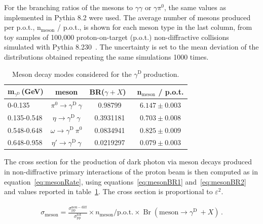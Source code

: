 \documentclass[12pt,a4paper]{article}
\newcommand{\mathDP}{\gamma^{\mathrm{D}}\ }
\newcommand{\DP}{$\mathDP$}
\newcommand{\mDP}{m$_{\mathDP}$}
\newcommand{\Br}{\mathop\mathrm{Br}}
\begin{document}
For the branching ratios of the mesons to $\gamma\gamma$ or
$\gamma\pi^0$, the same values as implemented in Pythia 8.2 were
used. The average number of mesons produced per p.o.t.,
n$_{\mathrm{meson}}$ / p.o.t., is shown for each meson type in the
last column, from toy samples of 100,000 proton-on-target (p.o.t.)
non-diffractive collisions simulated with Pythia
8.230~\cite{Sjostrand:2014zea}. The uncertainty is set to the mean
deviation of the distributions obtained repeating the same simulations
1000 times.


\begin{table}[thbp]
  \centering
  \begin{tabular}{|l|c|c|c|}
\hline
\mDP (GeV) & meson &  BR($\gamma+X$)~\cite{Sjostrand:2014zea} & n$_{\mathrm{meson}}$ / p.o.t. \\
\hline 
0-0.135  &    $\pi^{0}\rightarrow\mathDP\gamma$ &  0.98799 &  $6.147 \pm 0.003$ \\
0.135-0.548  &   $\eta\rightarrow\mathDP\gamma$ &  0.3931181 &  $0.703 \pm 0.008$\\
0.548-0.648  &   $\omega\rightarrow\mathDP\pi^0$ & 0.0834941 &  $0.825 \pm 0.009$ \\
0.648-0.958  &    $\eta'\rightarrow\mathDP\gamma$ & 0.0219297 & $0.079 \pm 0.003$ \\
\hline
\end{tabular}
  \caption{Meson decay modes considered for the \DP production.}
  \label{tab:mesonDecays}
\end{table}


The cross section for the production of dark photon via meson decays
produced in non-diffractive primary interactions of the proton beam is
then computed as in equation~\ref{eq:mesonRate}, using
equations~\ref{eq:mesonBR1} and~\ref{eq:mesonBR2} and values reported
in table~\ref{tab:mesonDecays}. The cross section is proportional to
$\varepsilon^2$.

\begin{align}
	\sigma_{\mathrm{meson}} = \frac{\sigma_{\mathrm{pp}}^{\mathrm{non-diff}}}{\sigma_{\mathrm{pp}}^{\mathrm{tot}}} \times n_{\mathrm{meson}} \mathrm{/ p.o.t.} \times \Br(\mathrm{meson}\to \mathDP+X)\,.\label{eq:mesonRate}
\end{align}
\end{document}
